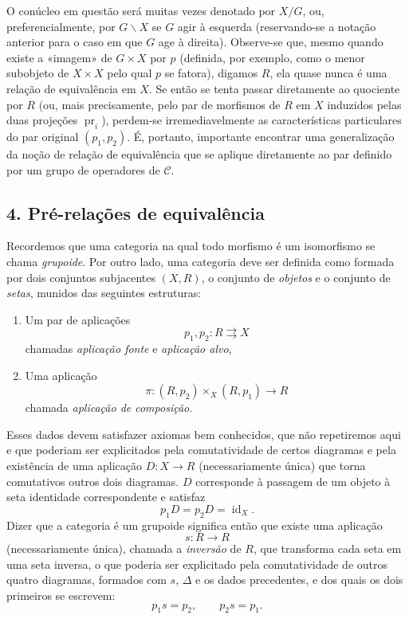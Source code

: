 \documentclass[11pt,twoside,openany]{book}
\numberwithin{equation}{section}
\newcommand{\src}[1]{%
  \phantomsection\hypertarget{src:#1}{}%
  \marginpar{\raggedleft\footnotesize\sffamily #1}%
}
\theoremstyle{plain}
\theoremstyle{definition}
\theoremstyle{remark}
\newcommand{\FgaUnitKey}{frontmatter}
\renewcommand{\src}[1]{%
  \phantomsection\hypertarget{src:\FgaUnitKey:#1}{}%
  \marginpar{\raggedleft\footnotesize\sffamily #1}%
}
\begin{document}
O conúcleo em questão será muitas vezes denotado por $X/G$, ou,
preferencialmente, por $G\backslash X$ se $G$ agir à esquerda (reservando-se a
notação anterior para o caso em que $G$ age à direita). Observe-se que, mesmo
quando existe a «imagem» de $G\times X$ por $p$ (definida, por exemplo, como o
menor subobjeto de $X\times X$ pelo qual $p$ se fatora), digamos $R$, ela quase
nunca é uma relação de equivalência em $X$. Se então se tenta passar
diretamente ao quociente por $R$ (ou, mais precisamente, pelo par de morfismos
de $R$ em $X$ induzidos pelas duas projeções $\operatorname{pr}_i$), perdem-se
irremediavelmente as características particulares do par original
$(p_1,p_2)$. É, portanto, importante encontrar uma generalização da noção de
relação de equivalência que se aplique diretamente ao par definido por um
grupo de operadores de $\mathcal C$.

\subsection*{4. Pré-relações de equivalência}

Recordemos que uma categoria na qual todo morfismo é um isomorfismo se chama
\emph{grupoide}. Por outro lado, uma categoria deve ser definida como formada
por dois conjuntos subjacentes $(X,R)$, o conjunto de \emph{objetos} e o
conjunto de \emph{setas}, munidos das seguintes estruturas:
\src{106}
\begin{enumerate}
\item[(i)] Um par de aplicações
\[
  p_1,p_2:R\rightrightarrows X
\]
chamadas \emph{aplicação fonte} e \emph{aplicação alvo},

\item[(ii)] Uma aplicação
\[
  \pi:(R,p_2)\times_X(R,p_1)\longrightarrow R
\]
chamada \emph{aplicação de composição}.
\end{enumerate}
Esses dados devem satisfazer axiomas bem conhecidos, que não repetiremos aqui
e que poderiam ser explicitados pela comutatividade de certos diagramas e pela
existência de uma aplicação $D:X\to R$ (necessariamente única) que torna
comutativos outros dois diagramas. $D$ corresponde à passagem de um objeto à
seta identidade correspondente e satisfaz
\[
  p_1D=p_2D=\operatorname{id}_X.
\]
Dizer que a categoria é um grupoide significa então que existe uma aplicação
\[
  s:R\longrightarrow R
\]
(necessariamente única), chamada a \emph{inversão} de $R$, que transforma cada
seta em uma seta inversa, o que poderia ser explicitado pela comutatividade de
outros quatro diagramas, formados com $s$, $\Delta$ e os dados precedentes, e
dos quais os dois primeiros se escrevem:
\[
  p_1s=p_2,\qquad p_2s=p_1.
\]
\end{document}
